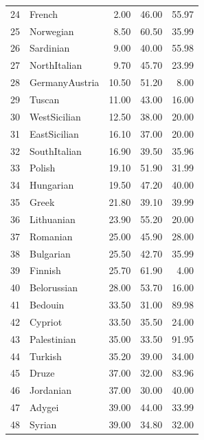 \documentclass[12pt]{article}
\begin{document}
\begin{table}[ht]
\begin{tabular}{rlrrr}
  24 & \textcolor{French}{French} & 2.00 & 46.00 & 55.97 \\ 
  25 & \textcolor{Norwegian}{Norwegian} & 8.50 & 60.50 & 35.99 \\ 
  26 & \textcolor{Sardinian}{Sardinian} & 9.00 & 40.00 & 55.98 \\ 
  27 & \textcolor{NorthItalian}{NorthItalian} & 9.70 & 45.70 & 23.99 \\ 
  28 & \textcolor{GermanyAustria}{GermanyAustria} & 10.50 & 51.20 & 8.00 \\ 
  29 & \textcolor{Tuscan}{Tuscan} & 11.00 & 43.00 & 16.00 \\ 
  30 & \textcolor{WestSicilian}{WestSicilian} & 12.50 & 38.00 & 20.00 \\ 
  31 & \textcolor{EastSicilian}{EastSicilian} & 16.10 & 37.00 & 20.00 \\ 
  32 & \textcolor{SouthItalian}{SouthItalian} & 16.90 & 39.50 & 35.96 \\ 
  33 & \textcolor{Polish}{Polish} & 19.10 & 51.90 & 31.99 \\ 
  34 & \textcolor{Hungarian}{Hungarian} & 19.50 & 47.20 & 40.00 \\ 
  35 & \textcolor{Greek}{Greek} & 21.80 & 39.10 & 39.99 \\ 
  36 & \textcolor{Lithuanian}{Lithuanian} & 23.90 & 55.20 & 20.00 \\ 
  37 & \textcolor{Romanian}{Romanian} & 25.00 & 45.90 & 28.00 \\ 
  38 & \textcolor{Bulgarian}{Bulgarian} & 25.50 & 42.70 & 35.99 \\ 
  39 & \textcolor{Finnish}{Finnish} & 25.70 & 61.90 & 4.00 \\ 
  40 & \textcolor{Belorussian}{Belorussian} & 28.00 & 53.70 & 16.00 \\ 
  41 & \textcolor{Bedouin}{Bedouin} & 33.50 & 31.00 & 89.98 \\ 
  42 & \textcolor{Cypriot}{Cypriot} & 33.50 & 35.50 & 24.00 \\ 
  43 & \textcolor{Palestinian}{Palestinian} & 35.00 & 33.50 & 91.95 \\ 
  44 & \textcolor{Turkish}{Turkish} & 35.20 & 39.00 & 34.00 \\ 
  45 & \textcolor{Druze}{Druze} & 37.00 & 32.00 & 83.96 \\ 
  46 & \textcolor{Jordanian}{Jordanian} & 37.00 & 30.00 & 40.00 \\ 
  47 & \textcolor{Adygei}{Adygei} & 39.00 & 44.00 & 33.99 \\ 
  48 & \textcolor{Syrian}{Syrian} & 39.00 & 34.80 & 32.00 \\ 

\end{tabular}
\end{table}
\end{document}
